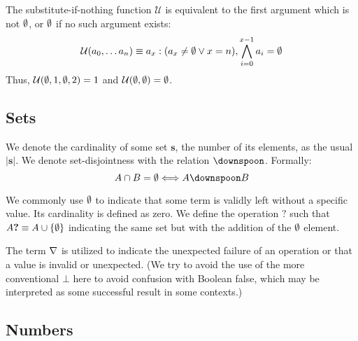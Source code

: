 

The substitute-if-nothing function $\mathcal{U}$ is equivalent to the first argument which is not $\emptyset$, or $\emptyset$ if no such argument exists:
\begin{align}\label{eq:substituteifnothing}
  \mathcal{U}(a_0, \dots a_n ) \equiv a_x : (a_x \ne \emptyset \vee x = n), \bigwedge_{i=0}^{x-1} a_i = \emptyset
\end{align}
Thus, \eg $\mathcal{U}(\emptyset, 1, \emptyset, 2) = 1$ and $\mathcal{U}(\emptyset, \emptyset) = \emptyset$.

\subsection{Sets}\label{sec:sets}

We denote the cardinality of some set $\mathbf{s}$, the number of its elements, as the usual $|\mathbf{s}|$. We denote set-disjointness with the relation $\disjoint$. Formally:
\begin{equation*}
  A \cap B = \none \Longleftrightarrow A \disjoint B
\end{equation*}

We commonly use $\emptyset$ to indicate that some term is validly left without a specific value. Its cardinality is defined as zero. We define the operation $\bm{?}$ such that $A\bm{?} \equiv A \cup \{\emptyset\}$ indicating the same set but with the addition of the $\emptyset$ element.

The term $\nabla$ is utilized to indicate the unexpected failure of an operation or that a value is invalid or unexpected. (We try to avoid the use of the more conventional $\bot$ here to avoid confusion with Boolean false, which may be interpreted as some successful result in some contexts.)

\subsection{Numbers}\label{sec:numbers}

